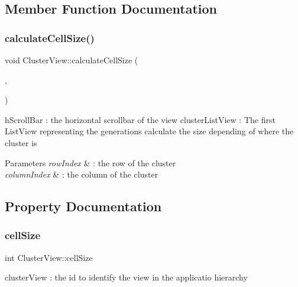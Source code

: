 \subsection{Member Function Documentation}
\mbox{\label{class_cluster_view_a123a487097e7146e7b0fb60bca7e2cd7}} 
\subsubsection{\texorpdfstring{calculate\+Cell\+Size()}{calculateCellSize()}}
{\footnotesize\ttfamily void Cluster\+View\+::calculate\+Cell\+Size (\begin{DoxyParamCaption}\item[{row\+Index}]{,  }\item[{column\+Index}]{ }\end{DoxyParamCaption})}

h\+Scroll\+Bar \+: the horizontal scrollbar of the view cluster\+List\+View \+: The first List\+View representing the generations calculate the size depending of where the cluster is 
\begin{DoxyParams}{Parameters}
{\em row\+Index} & \+: the row of the cluster \\
\hline
{\em column\+Index} & \+: the column of the cluster \\
\hline
\end{DoxyParams}


\subsection{Property Documentation}
\mbox{\label{class_cluster_view_a5df2c23ff0eab7f33c129bb00d2947e6}} 
\subsubsection{\texorpdfstring{cell\+Size}{cellSize}}
{\footnotesize\ttfamily int Cluster\+View\+::cell\+Size}

cluster\+View \+: the id to identify the view in the applicatio hierarchy \mbox{\label{class_cluster_view_a05d3648344da5a01277e2e82cfcb879d}} 
